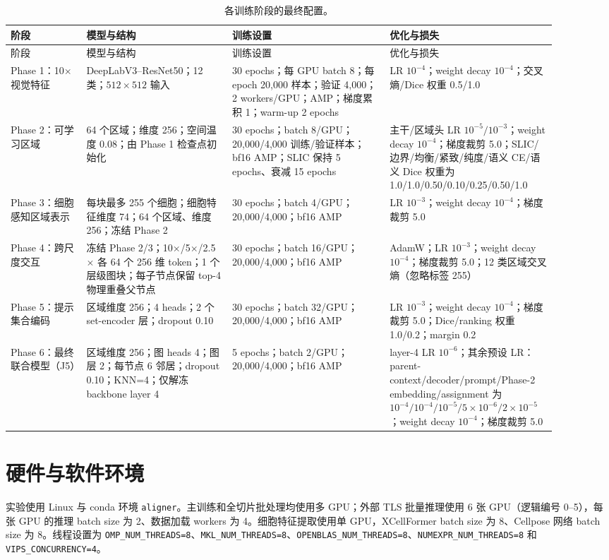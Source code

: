 \documentclass[11pt,letterpaper]{ctexart}
\newcommand{\code}[1]{\texttt{#1}}
\begin{document}
\footnotesize\sloppy
\begin{longtable}{p{0.13\linewidth}p{0.25\linewidth}p{0.27\linewidth}p{0.25\linewidth}}
\caption{各训练阶段的最终配置。}\label{tab:hyperparameters}\\
\toprule
阶段 & 模型与结构 & 训练设置 & 优化与损失\\
\midrule
\endfirsthead
\toprule
阶段 & 模型与结构 & 训练设置 & 优化与损失\\
\midrule
\endhead
Phase 1：10$\times$视觉特征 & DeepLabV3--ResNet50；12 类；$512\times512$ 输入 & 30 epochs；每 GPU batch 8；每 epoch 20,000 样本；验证 4,000；2 workers/GPU；AMP；梯度累积 1；warm-up 2 epochs & LR $10^{-4}$；weight decay $10^{-4}$；交叉熵/Dice 权重 0.5/1.0\\
Phase 2：可学习区域 & 64 个区域；维度 256；空间温度 0.08；由 Phase 1 检查点初始化 & 30 epochs；batch 8/GPU；20,000/4,000 训练/验证样本；bf16 AMP；SLIC 保持 5 epochs、衰减 15 epochs & 主干/区域头 LR $10^{-5}/10^{-3}$；weight decay $10^{-4}$；梯度裁剪 5.0；SLIC/边界/均衡/紧致/纯度/语义 CE/语义 Dice 权重为 1.0/1.0/0.50/0.10/0.25/0.50/1.0\\
Phase 3：细胞感知区域表示 & 每块最多 255 个细胞；细胞特征维度 74；64 个区域、维度 256；冻结 Phase 2 & 30 epochs；batch 4/GPU；20,000/4,000；bf16 AMP & LR $10^{-3}$；weight decay $10^{-4}$；梯度裁剪 5.0\\
Phase 4：跨尺度交互 & 冻结 Phase 2/3；10$\times$/5$\times$/2.5$\times$ 各 64 个 256 维 token；1 个层级图块；每子节点保留 top-4 物理重叠父节点 & 30 epochs；batch 16/GPU；20,000/4,000；bf16 AMP & AdamW；LR $10^{-3}$；weight decay $10^{-4}$；梯度裁剪 5.0；12 类区域交叉熵（忽略标签 255）\\
Phase 5：提示集合编码 & 区域维度 256；4 heads；2 个 set-encoder 层；dropout 0.10 & 30 epochs；batch 32/GPU；20,000/4,000；bf16 AMP & LR $10^{-3}$；weight decay $10^{-4}$；梯度裁剪 5.0；Dice/ranking 权重 1.0/0.2；margin 0.2\\
Phase 6：最终联合模型（J5） & 区域维度 256；图 heads 4；图层 2；每节点 6 邻居；dropout 0.10；KNN=4；仅解冻 backbone layer 4 & 5 epochs；batch 2/GPU；20,000/4,000；bf16 AMP & layer-4 LR $10^{-6}$；其余预设 LR：parent-context/decoder/prompt/Phase-2 embedding/assignment 为 $10^{-4}/10^{-4}/10^{-5}/5\times10^{-6}/2\times10^{-5}$；weight decay $10^{-4}$；梯度裁剪 5.0\\
\bottomrule
\end{longtable}
\fussy\normalsize

\section{硬件与软件环境}
实验使用 Linux 与 conda 环境 \code{aligner}。主训练和全切片批处理均使用多 GPU；外部 TLS 批量推理使用 6 张 GPU（逻辑编号 0--5），每张 GPU 的推理 batch size 为 2、数据加载 workers 为 4。细胞特征提取使用单 GPU，XCellFormer batch size 为 8、Cellpose 网络 batch size 为 8。线程设置为 \code{OMP\_NUM\_THREADS=8}、\code{MKL\_NUM\_THREADS=8}、\code{OPENBLAS\_NUM\_THREADS=8}、\code{NUMEXPR\_NUM\_THREADS=8} 和 \code{VIPS\_CONCURRENCY=4}。
\end{document}
